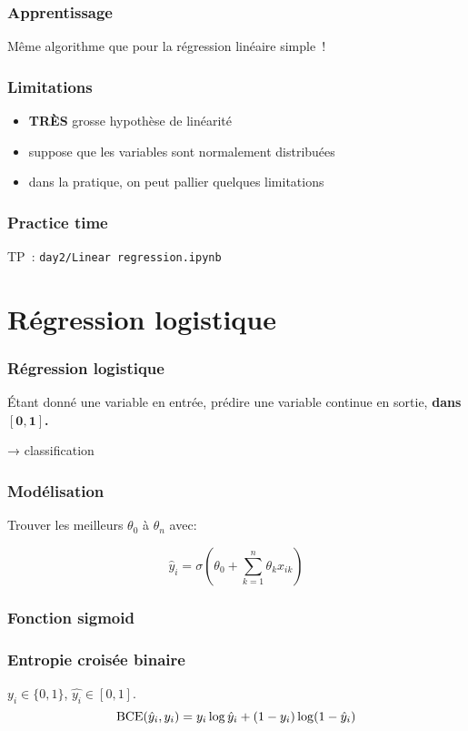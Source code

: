 \documentclass{formation}
\begin{document}
\begin{frame}
  \frametitle{Apprentissage}

  Même algorithme que pour la régression linéaire simple !
\end{frame}

\begin{frame}
  \frametitle{Limitations}

  \begin{itemize}
  \item \textbf{TRÈS} grosse hypothèse de linéarité
  \item suppose que les variables sont normalement distribuées
  \item dans la pratique, on peut pallier quelques limitations
  \end{itemize}
\end{frame}

\begin{frame}
  \frametitle{Practice time}

  TP : \texttt{day2/Linear regression.ipynb}
\end{frame}

\section{Régression logistique}

\begin{frame}
  \frametitle{Régression logistique}
  Étant donné une variable en entrée, prédire une variable continue en
  sortie, \textbf{dans $\mathbf{[0, 1]}$.}

  → classification
\end{frame}

\begin{frame}
  \frametitle{Modélisation}
    Trouver les meilleurs $\theta_0$ à $\theta_n$ avec:

  \[
    \hat{y}_i = \sigma(\theta_0 + \sum_{k = 1}^{n}\theta_kx_{ik})
  \]
\end{frame}

\begin{frame}
  \frametitle{Fonction sigmoid}

\end{frame}

\begin{frame}
  \frametitle{Entropie croisée binaire}
  $y_i \in \{0, 1\}$, $\hat{y_i} \in [0,1]$.
  \[
    \BCE(\hat{y}_i, y_i) = y_i\log \hat{y}_i + (1 - y_i)\log (1 -
    \hat{y}_i)
  \]

\end{frame}
\end{document}
